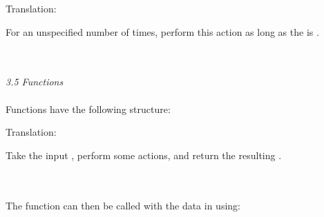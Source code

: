 \begin{minipage}[t]{0.2\textwidth}
Translation:
\end{minipage}
\begin{minipage}[t]{0.8\textwidth}
For an unspecified number of times, perform this action as long as the  is .
\end{minipage} \\
\\

\textit{3.5 Functions} \\
\\
Functions have the following structure: \\


\begin{minipage}[t]{0.2\textwidth}
Translation:
\end{minipage}
\begin{minipage}[t]{0.8\textwidth}
Take the input , perform some actions, and return the resulting .
\end{minipage} \\
\\
The function  can then be called with the data in  using: \\
\\

\clearpage %